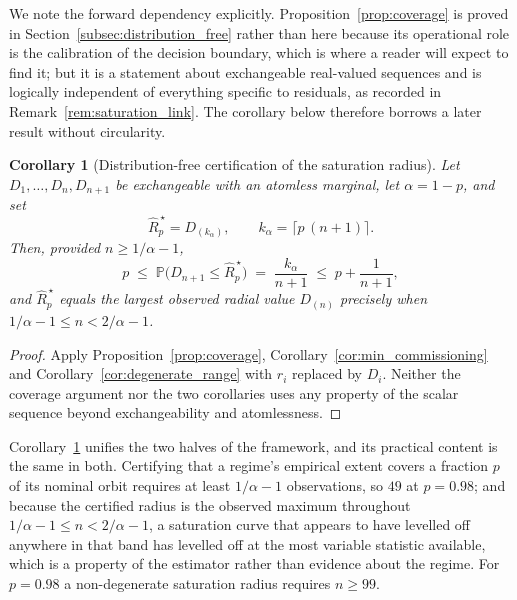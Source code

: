 \documentclass[a4paper]{cas-sc}
\newtheorem{corollary}{Corollary}
\newcommand{\residual}{\ensuremath{r}}
\newcommand{\Prob}{\ensuremath{\mathbb{P}}}
\begin{document}
We note the forward dependency explicitly. Proposition~\ref{prop:coverage} is
proved in Section~\ref{subsec:distribution_free} rather than here because its
operational role is the calibration of the decision boundary, which is where a
reader will expect to find it; but it is a statement about exchangeable
real-valued sequences and is logically independent of everything specific to
residuals, as recorded in Remark~\ref{rem:saturation_link}. The corollary below
therefore borrows a later result without circularity.

\begin{corollary}[Distribution-free certification of the saturation radius]
\label{cor:saturation_certification}
Let \(D_1,\ldots,D_n,D_{n+1}\) be exchangeable with an atomless marginal, let
\(\alpha=1-p\), and set
\begin{equation}
\widehat R^{\,\star}_p = D_{(k_\alpha)},
\qquad k_\alpha = \bigl\lceil p\,(n+1) \bigr\rceil .
\label{eq:radius_order_statistic}
\end{equation}
Then, provided \(n\ge 1/\alpha-1\),
\begin{equation}
p \;\le\; \Prob\bigl(D_{n+1}\le \widehat R^{\,\star}_p\bigr)
  \;=\; \frac{k_\alpha}{n+1}
  \;\le\; p+\frac{1}{n+1},
\label{eq:radius_coverage}
\end{equation}
and \(\widehat R^{\,\star}_p\) equals the largest observed radial value
\(D_{(n)}\) precisely when \(1/\alpha-1\le n<2/\alpha-1\).
\end{corollary}

\begin{proof}
Apply Proposition~\ref{prop:coverage}, Corollary~\ref{cor:min_commissioning}
and Corollary~\ref{cor:degenerate_range} with \(\residual_i\) replaced by
\(D_i\). Neither the coverage argument nor the two corollaries uses any
property of the scalar sequence beyond exchangeability and atomlessness.
\end{proof}

Corollary~\ref{cor:saturation_certification} unifies the two halves of the
framework, and its practical content is the same in both. Certifying that a
regime's empirical extent covers a fraction \(p\) of its nominal orbit
requires at least \(1/\alpha-1\) observations, so \(49\) at \(p=0.98\); and
because the certified radius is the observed maximum throughout
\(1/\alpha-1\le n<2/\alpha-1\), a saturation curve that appears to have
levelled off anywhere in that band has levelled off at the most variable
statistic available, which is a property of the estimator rather than evidence
about the regime. For \(p=0.98\) a non-degenerate saturation radius requires
\(n\ge 99\).
\end{document}

